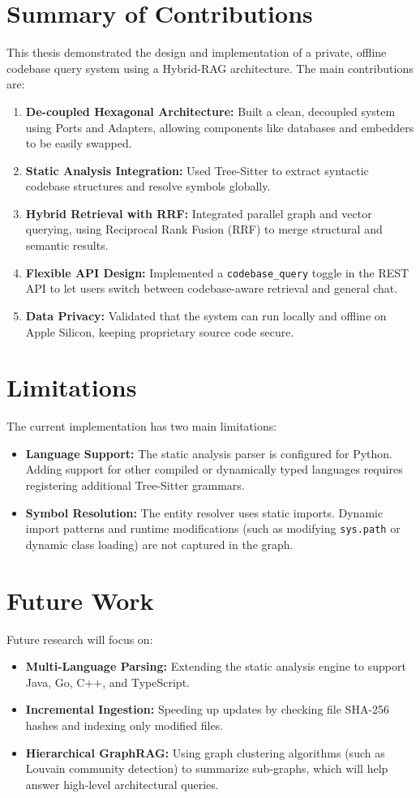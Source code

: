 \documentclass[12pt,a4paper,oneside]{report}
\begin{document}
\section{Summary of Contributions}
This thesis demonstrated the design and implementation of a private, offline codebase query system using a Hybrid-RAG architecture. The main contributions are:
\begin{enumerate}
    \item \textbf{De-coupled Hexagonal Architecture:} Built a clean, decoupled system using Ports and Adapters, allowing components like databases and embedders to be easily swapped.
    \item \textbf{Static Analysis Integration:} Used Tree-Sitter to extract syntactic codebase structures and resolve symbols globally.
    \item \textbf{Hybrid Retrieval with RRF:} Integrated parallel graph and vector querying, using Reciprocal Rank Fusion (RRF) to merge structural and semantic results.
    \item \textbf{Flexible API Design:} Implemented a \texttt{codebase\_query} toggle in the REST API to let users switch between codebase-aware retrieval and general chat.
    \item \textbf{Data Privacy:} Validated that the system can run locally and offline on Apple Silicon, keeping proprietary source code secure.
\end{enumerate}

\section{Limitations}
The current implementation has two main limitations:
\begin{itemize}
    \item \textbf{Language Support:} The static analysis parser is configured for Python. Adding support for other compiled or dynamically typed languages requires registering additional Tree-Sitter grammars.
    \item \textbf{Symbol Resolution:} The entity resolver uses static imports. Dynamic import patterns and runtime modifications (such as modifying \texttt{sys.path} or dynamic class loading) are not captured in the graph.
\end{itemize}

\section{Future Work}
Future research will focus on:
\begin{itemize}
    \item \textbf{Multi-Language Parsing:} Extending the static analysis engine to support Java, Go, C++, and TypeScript.
    \item \textbf{Incremental Ingestion:} Speeding up updates by checking file SHA-256 hashes and indexing only modified files.
    \item \textbf{Hierarchical GraphRAG:} Using graph clustering algorithms (such as Louvain community detection) to summarize sub-graphs, which will help answer high-level architectural queries.
\end{itemize}
\end{document}
